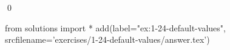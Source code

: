 
\begin{ex}
  \label{ex:1-24-default-values}
  
  \qed
\end{ex}
\begin{python0}
from solutions import *
add(label="ex:1-24-default-values",
    srcfilename='exercises/1-24-default-values/answer.tex')
\end{python0}
